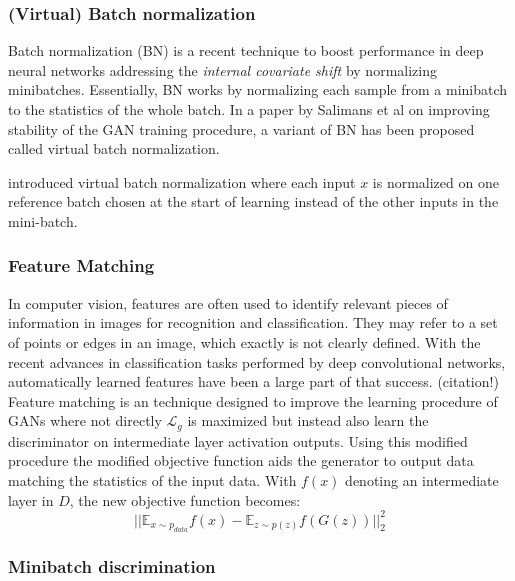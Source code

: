 \subsubsection{(Virtual) Batch normalization}
\label{ssub:gan_batch_norm}
Batch normalization (BN) \cite{batch_norm:2015} is a recent technique to boost performance in deep neural networks addressing the \emph{internal covariate shift} by normalizing minibatches.
Essentially, BN works by normalizing each sample from a minibatch to the statistics of the whole batch.
In a paper \cite{improved_gan:2016} by Salimans et al on improving stability of the GAN training procedure, a variant of BN has been proposed called virtual batch normalization.


\cite{improved_gan:2016} introduced virtual batch normalization where each input $x$ is normalized on one reference batch chosen at the start of learning instead of the other inputs in the mini-batch.

\subsubsection{Feature Matching}
\label{ssub:gan_feature_matching}
In computer vision, features are often used to identify relevant pieces of information in images for recognition and classification.
They may refer to a set of points or edges in an image, which exactly is not clearly defined.
With the recent advances in classification tasks performed by deep convolutional networks, automatically learned features have been a large part of that success. (citation!)
Feature matching is an technique designed to improve the learning procedure of GANs where not directly $\mathcal{L}_g$ is maximized but instead also learn the discriminator on intermediate layer activation outputs.
Using this modified procedure the modified objective function aids the generator to output data matching the statistics of the input data.
With $f(x)$ denoting an intermediate layer in $D$, the new objective function becomes:
$$
|| \mathbb{E}_{x \sim p_{data}}f(x) - \mathbb{E}_{z \sim p(z)}f(G(z)) || ^{2}_{2}
$$


\subsubsection{Minibatch discrimination}
\label{ssub:gan_minibatch_discrimination}

